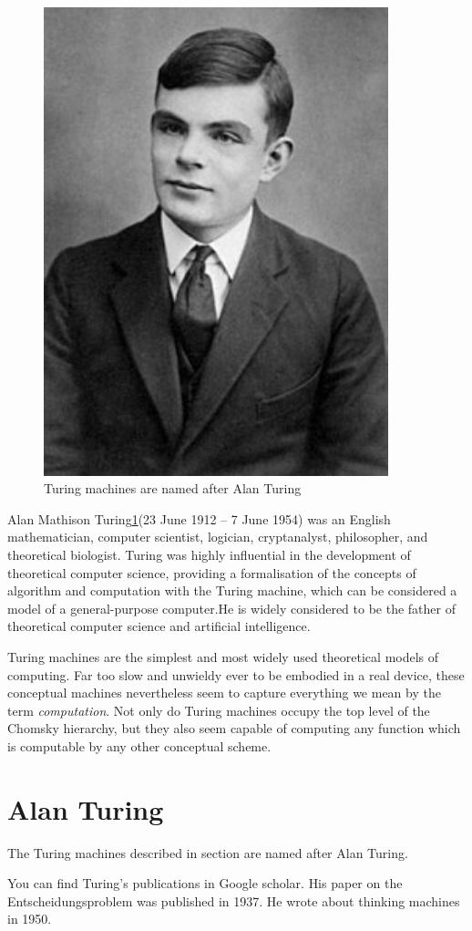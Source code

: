 \documentclass[a4paper]{article}
\begin{document}
\begin{figure}
\includegraphics[width=10cm]{Turing.jpg}
\caption{Turing machines are named after Alan Turing}
\label{figure:turing}
\end{figure}

Alan Mathison Turing\ref{figure:turing}(23 June 1912 – 7 June 1954) was an English mathematician, computer scientist, logician, cryptanalyst, philosopher, and theoretical biologist. Turing was highly influential in the development of theoretical computer science, providing a formalisation of the concepts of algorithm and computation with the Turing machine, which can be considered a model of a general-purpose computer.He is widely considered to be the father of theoretical computer science and artificial intelligence.

Turing machines are the simplest and most widely used theoretical models of computing. Far too slow and unwieldy ever to be embodied in a real device, these conceptual machines nevertheless seem to capture everything we mean by the term \textit{computation}. Not only do Turing machines occupy the top level of the Chomsky hierarchy, but they also seem capable of computing any function which is computable by any other conceptual scheme.

\section{Alan Turing}
The Turing machines described in section are named after Alan Turing.

You can find Turing's publications in Google scholar. \cite{googlescholar}
His paper on the Entscheidungsproblem was published in 1937. \cite{alanturing}
He wrote about thinking machines in 1950. \cite{turingomnibus}


\end{document}
